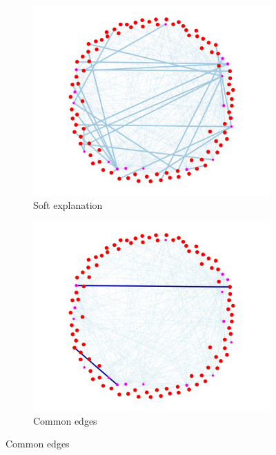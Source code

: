 \begin{figure}[h]
    \centering
    \begin{subfigure}[b]{0.3\textwidth}
        \includegraphics[width=\linewidth]{img/SAT-soft/2025-05-14 20_50_23-seed4_highestAUC_TEST.html.png}
        \caption{Soft explanation}
        \label{fig:soft_pred}
    \end{subfigure}
    \begin{subfigure}[b]{0.3\textwidth}
        \includegraphics[width=\linewidth]{img/SAT-soft/2025-05-14 20_51_51-seed4_highestAUC_commonEdges_TEST.html.png}
        \caption{Common edges}

\end{subfigure}
\end{figure}

